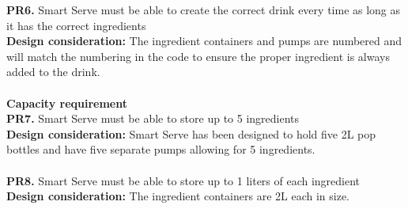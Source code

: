 \documentclass[12pt, titlepage]{article}
\begin{document}
        \noindent\textbf{PR6.} Smart Serve must be able to create the correct drink every time as long as it has the correct ingredients \\
        \indent\textbf{Design consideration:} The ingredient containers and pumps are numbered and will match the numbering in the code to ensure the proper ingredient is always added to the drink.\\\\
    \textbf{Capacity requirement}\\
        \noindent\textbf{PR7.} Smart Serve must be able to store up to 5 ingredients \\
        \indent\textbf{Design consideration:} Smart Serve has been designed to hold five 2L pop bottles and have five separate pumps allowing for 5 ingredients.\\\\
        \textbf{PR8.} Smart Serve must be able to store up to 1 liters of each ingredient \\
        \indent\textbf{Design consideration:} The ingredient containers are 2L each in size.
\end{document}

